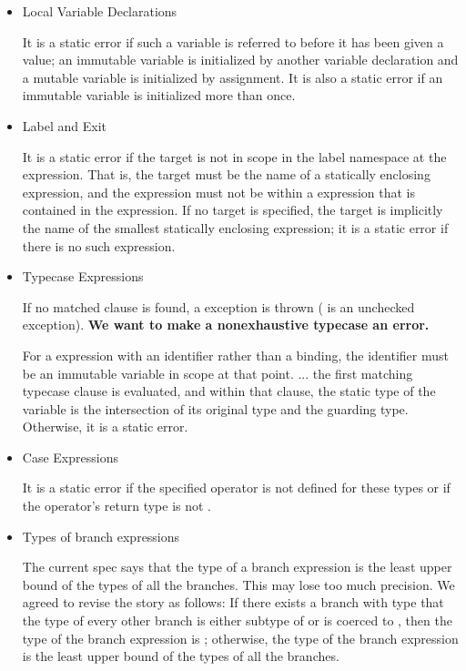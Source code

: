 \begin{itemize}
\item {} Local Variable Declarations

It is a static error if such a variable is referred to before it has been
given a value; an immutable variable is initialized by another variable
declaration and a mutable variable is initialized by assignment.
It is also a static error if an immutable variable is initialized
more than once.

\item {} Label and Exit

It is a static error if the target is not in scope
    in the label namespace at the  expression.
    That is, the target must be the name of a statically enclosing 
    expression, and the  expression must not be within a 
    expression that is contained in the  expression.
    If no target is specified, the target is implicitly the name
    of the smallest statically enclosing  expression;
    it is a static error if there is no such expression.

\item {} Typecase Expressions

If no matched clause is found, a  exception is thrown
( is an unchecked exception).
{\bf We want to make a nonexhaustive typecase an error.}

For a  expression with an identifier rather than a binding,
the identifier must be an immutable variable in scope at that point.
...
the first matching typecase clause is evaluated,
and within that clause,
the static type of the variable
is the intersection of its original type and the guarding type.
Otherwise, it is a static error.

\item {} Case Expressions

It is a static error if the specified operator is not defined for these types
or if the operator's return type is not .

 \item Types of branch expressions

The current spec says that the type of a branch expression is the least upper bound of the types of all the branches. This may lose too much precision. We agreed to revise the story as follows: If there exists a branch with type  that the type of every other branch is either subtype of  or is coerced to , then the type of the branch expression is ; otherwise, the type of the branch expression is the least upper bound of the types of all the branches.


\end{itemize}
